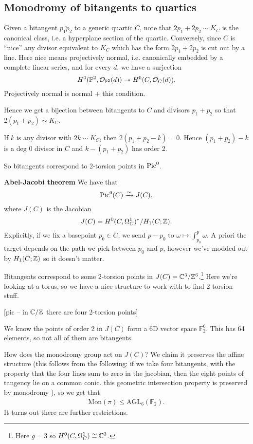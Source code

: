 \documentclass[11pt]{amsart}
\providecommand{\Mon}{\mathrm{Mon}}
\begin{document}
\subsection{Monodromy of bitangents to quartics}

Given a bitangent $\overline{p_1 p_2}$ to a generic quartic $C$, note that $2p_1 + 2p_2 \sim K_C$ is the canonical class, i.e. a hyperplane section of the quartic. Conversely, since $C$ is ``nice'' any divisor equivalent to $K_C$ which has the form $2p_1 + 2p_2$ is cut out by a line. Here nice means projectively normal, i.e. canonically embedded by a complete linear series, and for every $d$, we have a surjection
\begin{align*}
    H^0(\mathbb{P}^2, \mathcal{O}_{\mathbb{P}^2}(d)) \twoheadrightarrow H^0(C,\mathcal{O}_C(d)).
\end{align*}
Projectively normal is normal + this condition.

Hence we get a bijection between bitangents to $C$ and divisors $p_1 + p_2$ so that $2(p_1 + p_2)\sim K_C$.

If $k$ is any divisor with $2k\sim K_C$, then $2(p_1 + p_2 - k) = 0$. Hence $(p_1 + p_2) - k$ is a deg 0 divisor in $C$ and $k - (p_1 + p_2)$ has order 2.

So bitangents correspond to 2-torsion points in $\mathrm{Pic}^0$.

\textbf{Abel-Jacobi theorem} We have that
\begin{align*}
    \mathrm{Pic}^0(C) \xrightarrow{\sim} J(C),
\end{align*}
where $J(C)$ is the Jacobian
\begin{align*}
    J(C) = H^0(C,\Omega^1_C)^\ast / H_1(C;\mathbb{Z}).
\end{align*}
%
Explicitly, if we fix a basepoint $p_0 \in C$, we send $p - p_0$ to $\omega \mapsto \int_{p_0}^p \omega$. A priori the target depends on the path we pick between $p_0$ and $p$, however we've modded out by $H_1(C;\mathbb{Z})$ so it doesn't matter.

Bitangents correspond to some 2-torsion points in $J(C) = \mathbb{C}^3 / \mathbb{Z}^6$.\footnote{Here $g = 3$ so $H^0(C,\Omega^1_C) \cong \mathbb{C}^3$.} Here we're looking at a torus, so we have a nice structure to work with to find 2-torsion stuff.

[pic -- in $\mathbb{C}/\mathbb{Z}$ there are four 2-torsion points]

We know the points of order 2 in $J(C)$ form a 6D vector space $\mathbb{F}_2^{6}$. This has 64 elements, so not all of them are bitangents.

How does the monodromy group act on $J(C)$? We claim it preserves the affine structure (this follows from the following: if we take four bitangents, with the property that the four lines sum to zero in the jacobian, then the eight points of tangency lie on a common conic. this geometric intersection property is preserved by monodromy ), so we get that
\begin{align*}
    \Mon(\pi) \le \text{AGL}_6(\mathbb{F}_2).
\end{align*}
%
It turns out there are further restrictions.
\end{document}
